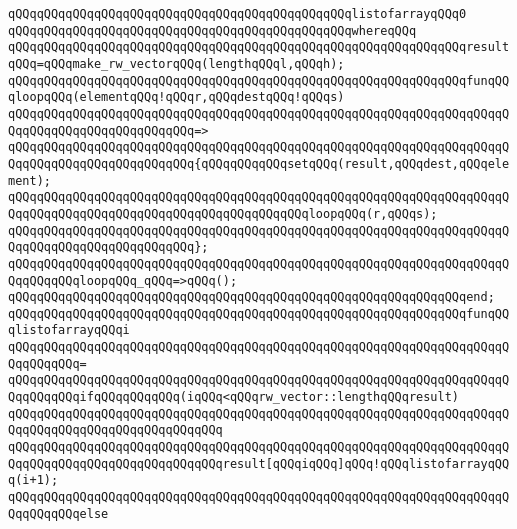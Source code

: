\verb|qQQqqQQqqQQqqQQqqQQqqQQqqQQqqQQqqQQqqQQqqQQqqQQqlistofarrayqQQq0|\newline
\verb|qQQqqQQqqQQqqQQqqQQqqQQqqQQqqQQqqQQqqQQqqQQqqQQqwhereqQQq|\newline
\newline
\verb|qQQqqQQqqQQqqQQqqQQqqQQqqQQqqQQqqQQqqQQqqQQqqQQqqQQqqQQqqQQqqQQqresultqQQq=qQQqmake_rw_vectorqQQq(lengthqQQql,qQQqh);|\newline
\newline
\verb|qQQqqQQqqQQqqQQqqQQqqQQqqQQqqQQqqQQqqQQqqQQqqQQqqQQqqQQqqQQqqQQqfunqQQqloopqQQq(elementqQQq!qQQqr,qQQqdestqQQq!qQQqs)|\newline
\verb|qQQqqQQqqQQqqQQqqQQqqQQqqQQqqQQqqQQqqQQqqQQqqQQqqQQqqQQqqQQqqQQqqQQqqQQqqQQqqQQqqQQqqQQqqQQqqQQq=>|\newline
\verb|qQQqqQQqqQQqqQQqqQQqqQQqqQQqqQQqqQQqqQQqqQQqqQQqqQQqqQQqqQQqqQQqqQQqqQQqqQQqqQQqqQQqqQQqqQQqqQQq{qQQqqQQqqQQqsetqQQq(result,qQQqdest,qQQqelement);|\newline
\verb|qQQqqQQqqQQqqQQqqQQqqQQqqQQqqQQqqQQqqQQqqQQqqQQqqQQqqQQqqQQqqQQqqQQqqQQqqQQqqQQqqQQqqQQqqQQqqQQqqQQqqQQqqQQqqQQqloopqQQq(r,qQQqs);|\newline
\verb|qQQqqQQqqQQqqQQqqQQqqQQqqQQqqQQqqQQqqQQqqQQqqQQqqQQqqQQqqQQqqQQqqQQqqQQqqQQqqQQqqQQqqQQqqQQqqQQq};|\newline
\newline
\verb|qQQqqQQqqQQqqQQqqQQqqQQqqQQqqQQqqQQqqQQqqQQqqQQqqQQqqQQqqQQqqQQqqQQqqQQqqQQqqQQqloopqQQq_qQQq=>qQQq();|\newline
\verb|qQQqqQQqqQQqqQQqqQQqqQQqqQQqqQQqqQQqqQQqqQQqqQQqqQQqqQQqqQQqqQQqend;|\newline
\newline
\verb|qQQqqQQqqQQqqQQqqQQqqQQqqQQqqQQqqQQqqQQqqQQqqQQqqQQqqQQqqQQqqQQqfunqQQqlistofarrayqQQqi|\newline
\verb|qQQqqQQqqQQqqQQqqQQqqQQqqQQqqQQqqQQqqQQqqQQqqQQqqQQqqQQqqQQqqQQqqQQqqQQqqQQqqQQq=|\newline
\verb|qQQqqQQqqQQqqQQqqQQqqQQqqQQqqQQqqQQqqQQqqQQqqQQqqQQqqQQqqQQqqQQqqQQqqQQqqQQqqQQqifqQQqqQQqqQQq(iqQQq<qQQqrw_vector::lengthqQQqresult)|\newline
\verb|qQQqqQQqqQQqqQQqqQQqqQQqqQQqqQQqqQQqqQQqqQQqqQQqqQQqqQQqqQQqqQQqqQQqqQQqqQQqqQQqqQQqqQQqqQQqqQQqqQQq|\newline
\verb|qQQqqQQqqQQqqQQqqQQqqQQqqQQqqQQqqQQqqQQqqQQqqQQqqQQqqQQqqQQqqQQqqQQqqQQqqQQqqQQqqQQqqQQqqQQqqQQqqQQqresult[qQQqiqQQq]qQQq!qQQqlistofarrayqQQq(i+1);|\newline
\verb|qQQqqQQqqQQqqQQqqQQqqQQqqQQqqQQqqQQqqQQqqQQqqQQqqQQqqQQqqQQqqQQqqQQqqQQqqQQqqQQqelse|\newline
